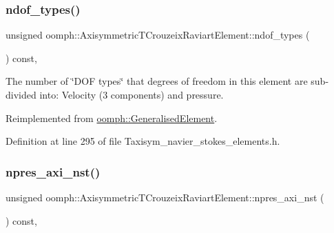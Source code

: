 \mbox{\label{classoomph_1_1AxisymmetricTCrouzeixRaviartElement_abc543e9ea6d95d89c87f273a365f1b39}} 
\subsubsection{\texorpdfstring{ndof\+\_\+types()}{ndof\_types()}}
{\footnotesize\ttfamily unsigned oomph\+::\+Axisymmetric\+T\+Crouzeix\+Raviart\+Element\+::ndof\+\_\+types (\begin{DoxyParamCaption}{ }\end{DoxyParamCaption}) const\hspace{0.3cm}{\ttfamily [inline]}, {\ttfamily [virtual]}}



The number of \char`\"{}\+D\+O\+F types\char`\"{} that degrees of freedom in this element are sub-\/divided into\+: Velocity (3 components) and pressure. 



Reimplemented from \hyperlink{classoomph_1_1GeneralisedElement_a0c6037a870597b35dcf1c780710b9a56}{oomph\+::\+Generalised\+Element}.



Definition at line 295 of file Taxisym\+\_\+navier\+\_\+stokes\+\_\+elements.\+h.

\mbox{\label{classoomph_1_1AxisymmetricTCrouzeixRaviartElement_a2614b5ab31a1cbac9a7f7887ce24c11a}} 
\subsubsection{\texorpdfstring{npres\+\_\+axi\+\_\+nst()}{npres\_axi\_nst()}}
{\footnotesize\ttfamily unsigned oomph\+::\+Axisymmetric\+T\+Crouzeix\+Raviart\+Element\+::npres\+\_\+axi\+\_\+nst (\begin{DoxyParamCaption}{ }\end{DoxyParamCaption}) const\hspace{0.3cm}{\ttfamily [inline]}, {\ttfamily [virtual]}}



